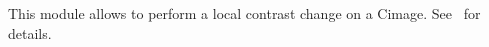 This module allows to perform a local contrast change on a Cimage.
See~\cite{caselles.lisani.ea:shape} for details.

